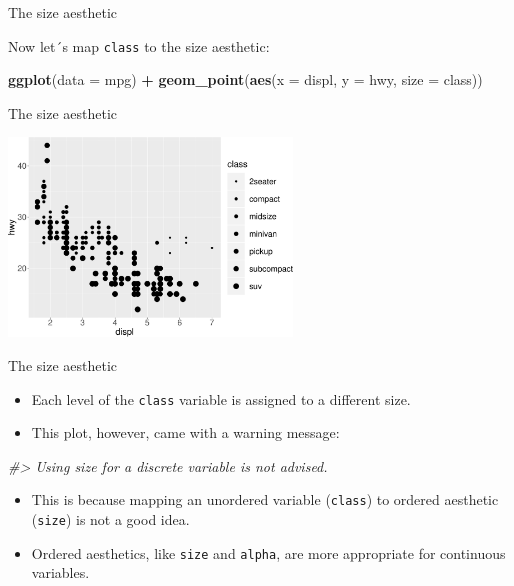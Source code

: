 \documentclass[ignorenonframetext,]{beamer}
\newenvironment{Shaded}{\begin{snugshade}}{\end{snugshade}}
\newcommand{\CommentTok}[1]{\textcolor[rgb]{0.56,0.35,0.01}{\textit{#1}}}
\newcommand{\DataTypeTok}[1]{\textcolor[rgb]{0.13,0.29,0.53}{#1}}
\newcommand{\KeywordTok}[1]{\textcolor[rgb]{0.13,0.29,0.53}{\textbf{#1}}}
\newcommand{\NormalTok}[1]{#1}
\newcommand{\OperatorTok}[1]{\textcolor[rgb]{0.81,0.36,0.00}{\textbf{#1}}}
\newcommand{\StringTok}[1]{\textcolor[rgb]{0.31,0.60,0.02}{#1}}
\begin{document}
\begin{frame}[fragile]{The size aesthetic}
\protect\hypertarget{the-size-aesthetic}{}

Now let´s map \texttt{class} to the size aesthetic:

\begin{Shaded}
\begin{Highlighting}[]
\KeywordTok{ggplot}\NormalTok{(}\DataTypeTok{data =}\NormalTok{ mpg) }\OperatorTok{+}
\StringTok{  }\KeywordTok{geom_point}\NormalTok{(}\KeywordTok{aes}\NormalTok{(}\DataTypeTok{x =}\NormalTok{ displ, }\DataTypeTok{y =}\NormalTok{ hwy, }\DataTypeTok{size =}\NormalTok{ class))}
\end{Highlighting}
\end{Shaded}

\end{frame}

\begin{frame}{The size aesthetic}
\protect\hypertarget{the-size-aesthetic-1}{}

\begin{center}\includegraphics[height=200px]{data-visualization_files/figure-beamer/unnamed-chunk-11-1} \end{center}

\end{frame}

\begin{frame}[fragile]{The size aesthetic}
\protect\hypertarget{the-size-aesthetic-2}{}

\begin{itemize}
\item
  Each level of the \texttt{class} variable is assigned to a different
  size.
\item
  This plot, however, came with a warning message:
\end{itemize}

\begin{Shaded}
\begin{Highlighting}[]
\CommentTok{#> Using size for a discrete variable is not advised.}
\end{Highlighting}
\end{Shaded}

\begin{itemize}
\item
  This is because mapping an unordered variable (\texttt{class}) to
  ordered aesthetic (\texttt{size}) is not a good idea.
\item
  Ordered aesthetics, like \texttt{size} and \texttt{alpha}, are more
  appropriate for continuous variables.
\end{itemize}

\end{frame}
\end{document}
